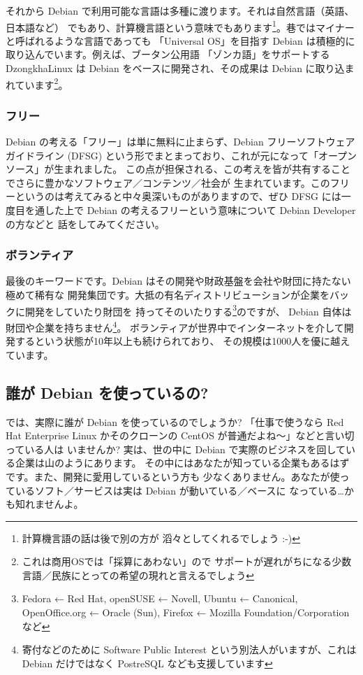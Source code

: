 \documentclass[mingoth,a4paper]{jsarticle}
\begin{document}
それから Debian で利用可能な言語は多種に渡ります。それは自然言語（英語、日本語など）
でもあり、計算機言語という意味でもあります\footnote{計算機言語の話は後で別の方が
滔々としてくれるでしょう :-)}。巷ではマイナーと呼ばれるような言語であっても
「Universal OS」を目指す Debian は積極的に取り込んでいます。例えば、ブータン公用語
「ゾンカ語」をサポートする DzongkhaLinux は Debian をベースに開発され、その成果は 
Debian に取り込まれています\footnote{これは商用OSでは「採算にあわない」ので
サポートが遅れがちになる少数言語／民族にとっての希望の現れと言えるでしょう}。


\subsubsection{フリー}
Debian の考える「フリー」は単に無料に止まらず、Debian フリーソフトウェアガイドライン
 (DFSG) という形でまとまっており、これが元になって「オープンソース」が生まれました。
この点が担保される、この考えを皆が共有することでさらに豊かなソフトウェア／コンテンツ／社会が
生まれています。このフリーというのは考えてみると中々奥深いものがありますので、ぜひ DFSG 
には一度目を通した上で Debian の考えるフリーという意味について Debian Developer の方などと
話をしてみてください。

\subsubsection{ボランティア}
最後のキーワードです。Debian はその開発や財政基盤を会社や財団に持たない極めて稀有な
開発集団です。大抵の有名ディストリビューションが企業をバックに開発をしていたり財団を
持ってそのいたりする\footnote{Fedora ← Red Hat, openSUSE ← Novell, Ubuntu ← Canonical, 
OpenOffice.org ← Oracle (Sun), Firefox ← Mozilla Foundation/Corporation など}のですが、
Debian 自体は財団や企業を持ちません\footnote{寄付などのために Software Public Interest 
という別法人がいますが、これは Debian だけではなく PostreSQL なども支援しています}。
ボランティアが世界中でインターネットを介して開発するという状態が10年以上も続けられており、
その規模は1000人を優に越えています。

\subsection{誰が Debian を使っているの?}
では、実際に誰が Debian を使っているのでしょうか? 「仕事で使うなら Red Hat 
Enterprise Linux かそのクローンの CentOS が普通だよね〜」などと言い切っている人は
いませんか? 実は、世の中に Debian で実際のビジネスを回している企業は山のようにあります。
その中にはあなたが知っている企業もあるはずです。また、開発に愛用しているという方も
少なくありません。あなたが使っているソフト／サービスは実は Debian が動いている／ベースに
なっている…かも知れませんよ。
\end{document}
